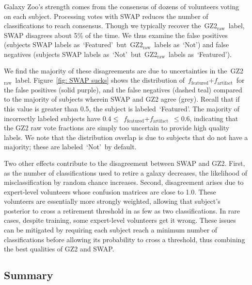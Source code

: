 \documentclass[twocolumn]{aastex6}
\newcommand{\feat}{`Featured'}
\newcommand{\notfeat}{`Not'}
\newcommand{\raw}{GZ2$_{\text{raw}}$}
\newcommand{\ffeat}{$f_{\mathrm{featured}}$}
\newcommand{\fstar}{$f_{\mathrm{artifact}}$}
\begin{document}

Galaxy Zoo's strength comes from the consensus of dozens of volunteers voting on each subject. 
Processing votes with SWAP reduces the number of classifications to reach consensus. 
Though we typically recover the~\raw~label, SWAP disagrees about 5\% of the time. 
We thus examine the false positives (subjects SWAP labels as~\feat~but~\raw~labels as~\notfeat) and false negatives (subjects SWAP labels as~\notfeat~but~\raw~labels as~\feat).


We find the majority of these disagreements are due to uncertainties in 
the~\raw~label. Figure~\ref{fig: SWAP sucks} shows the distribution of~\ffeat+\fstar~for the false positives (solid purple), and the false negatives (dashed teal) compared to the
majority of subjects wherein SWAP and GZ2 agree (grey).  
Recall that if this value is greater than 0.5, the subject is labeled~\feat.  
The majority of incorrectly 
labeled subjects have $0.4 \le$~\ffeat+\fstar~$\le 0.6$, indicating that 
the GZ2 raw vote fractions are simply too uncertain to provide high quality labels. 
We note that the distribution overlap is due to subjects that do not have a majority;
these are labeled~\notfeat~by default. 

Two other effects contribute to the disagreement between SWAP and GZ2. 
First, as the number of classifications used to retire a galaxy decreases, the 
likelihood of misclassification by random chance increases. 
Second, disagreement arises due to expert-level volunteers whose confusion 
matrices are close to 1.0. These volunteers are essentially more 
strongly weighted, allowing that subject's posterior to cross a retirement threshold
in as few as two classifications. In rare cases, despite training, some expert-level 
volunteers get it wrong. These issues can be mitigated by requiring each subject reach 
a minimum number of classifications before allowing its probability to cross a 
threshold, thus combining the best qualities of GZ2 and SWAP. 




\subsection{Summary}
\end{document}
